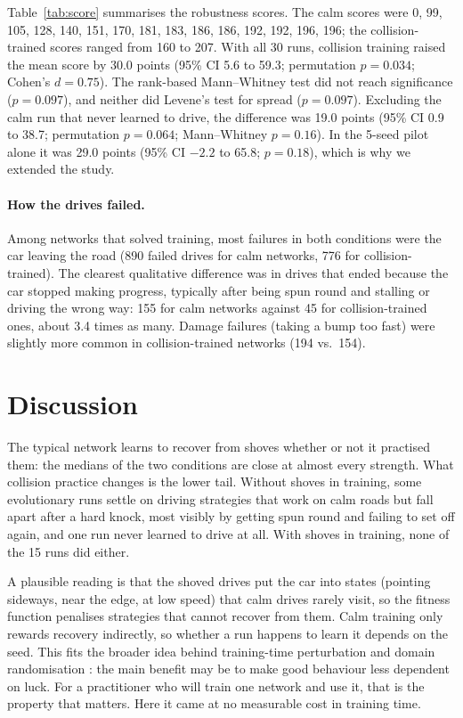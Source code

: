 \documentclass[11pt,a4paper]{article}
\begin{document}
Table~\ref{tab:score} summarises the robustness scores. The calm scores were 0, 99, 105, 128, 140, 151, 170, 181, 183, 186, 186, 192, 192, 196, 196; the collision-trained scores ranged from 160 to 207. With all 30 runs, collision training raised the mean score by 30.0 points (95\% CI 5.6 to 59.3; permutation $p=0.034$; Cohen's $d=0.75$). The rank-based Mann--Whitney test did not reach significance ($p=0.097$), and neither did Levene's test for spread ($p=0.097$). Excluding the calm run that never learned to drive, the difference was 19.0 points (95\% CI 0.9 to 38.7; permutation $p=0.064$; Mann--Whitney $p=0.16$). In the 5-seed pilot alone it was 29.0 points (95\% CI $-2.2$ to 65.8; $p=0.18$), which is why we extended the study.

\paragraph{How the drives failed.} Among networks that solved training, most failures in both conditions were the car leaving the road (890 failed drives for calm networks, 776 for collision-trained). The clearest qualitative difference was in drives that ended because the car stopped making progress, typically after being spun round and stalling or driving the wrong way: 155 for calm networks against 45 for collision-trained ones, about 3.4 times as many. Damage failures (taking a bump too fast) were slightly more common in collision-trained networks (194 vs.\ 154).

\section{Discussion}
The typical network learns to recover from shoves whether or not it practised them: the medians of the two conditions are close at almost every strength. What collision practice changes is the lower tail. Without shoves in training, some evolutionary runs settle on driving strategies that work on calm roads but fall apart after a hard knock, most visibly by getting spun round and failing to set off again, and one run never learned to drive at all. With shoves in training, none of the 15 runs did either.

A plausible reading is that the shoved drives put the car into states (pointing sideways, near the edge, at low speed) that calm drives rarely visit, so the fitness function penalises strategies that cannot recover from them. Calm training only rewards recovery indirectly, so whether a run happens to learn it depends on the seed. This fits the broader idea behind training-time perturbation and domain randomisation \cite{tobin2017dr,pinto2017rarl}: the main benefit may be to make good behaviour less dependent on luck. For a practitioner who will train one network and use it, that is the property that matters. Here it came at no measurable cost in training time.
\end{document}
